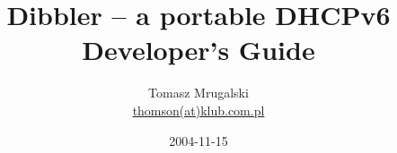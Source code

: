 \documentclass[10pt]{article}
\author{Tomasz Mrugalski\\ \small{\href{mailto:thomson(at)klub.com.pl}{thomson(at)klub.com.pl}}}
\date{2004-11-15}
\title{Dibbler -- a portable DHCPv6\\Developer's Guide}
\begin{document}
\vspace{-2cm}
\maketitle
\vspace{-1cm}
\begin{center}
  
\end{center}

\tableofcontents










\end{document}

